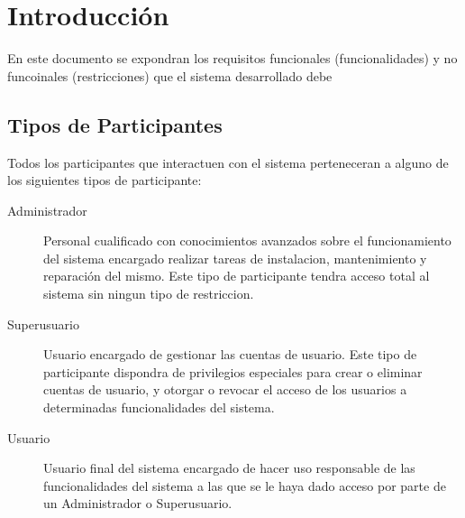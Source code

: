 \chapter{Introducción}

    En este documento se expondran los requisitos funcionales (funcionalidades) y no funcoinales (restricciones) que el sistema desarrollado debe 

\section{Tipos de Participantes}
    Todos los participantes que interactuen con el sistema perteneceran a alguno de los siguientes tipos de participante:
    
    \begin{description}
        \item[Administrador] Personal cualificado con conocimientos avanzados sobre el funcionamiento del sistema encargado realizar tareas de instalacion, mantenimiento y reparación del mismo. Este tipo de participante tendra acceso total al sistema sin ningun tipo de restriccion.

        \item[Superusuario] Usuario encargado de gestionar las cuentas de usuario. Este tipo de participante dispondra de privilegios especiales para crear o eliminar cuentas de usuario, y otorgar o revocar el acceso de los usuarios a determinadas funcionalidades del sistema.

        \item[Usuario] Usuario final del sistema encargado de hacer uso responsable de las funcionalidades del sistema a las que se le haya dado acceso por parte de un Administrador o Superusuario.
    \end{description}
    
    
    
 
